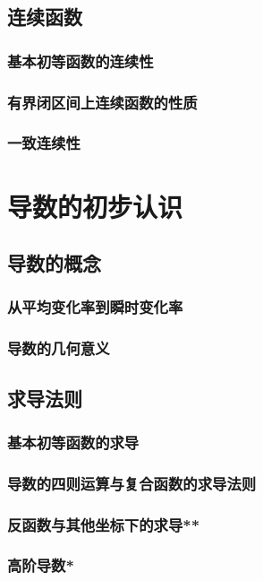 \section{连续函数}
\subsection{基本初等函数的连续性}
\clearpage
\subsection{有界闭区间上连续函数的性质}
\clearpage
\subsection{一致连续性}
\clearpage

\chapter{导数的初步认识}\label{导数的初步认识}
\section{导数的概念}
\subsection{从平均变化率到瞬时变化率}
\clearpage
\subsection{导数的几何意义}
\clearpage
\section{求导法则}
\subsection{基本初等函数的求导}
\clearpage
\subsection{导数的四则运算与复合函数的求导法则}
\clearpage
\subsection{反函数与其他坐标下的求导**}
\clearpage
\subsection{高阶导数*}
\clearpage

